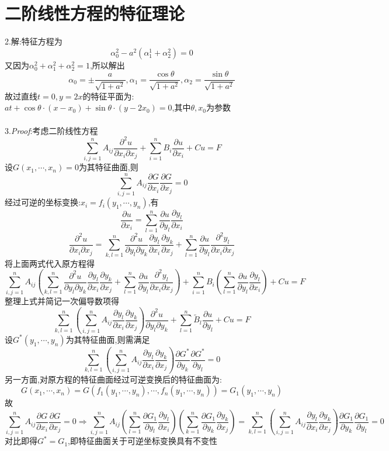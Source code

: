 \section{二阶线性方程的特征理论}
2.解:特征方程为
\[\alpha_0^2-a^2(\alpha_1^1+\alpha_2^2)=0\]
又因为$\alpha_0^2+\alpha_1^2+\alpha_2^2=1$,所以解出
\[\alpha_0=\pm\frac{a}{\sqrt{1+a^2}},\alpha_1=\frac{\cos\theta}{\sqrt{1+a^2}},\alpha_2=\frac{\sin\theta}{\sqrt{1+a^2}}\]
故过直线$t=0,y=2x$的特征平面为:$at+\cos\theta\cdot(x-x_0)+\sin\theta\cdot(y-2x_0)=0$,其中$\theta,x_0$为参数\\\\
3.\textit{Proof}:考虑二阶线性方程
\[\sum_{i,j=1}^nA_{ij}\frac{\partial^2u}{\partial x_i\partial x_j}+\sum_{i=1}^nB_i\frac{\partial u}{\partial x_i}+Cu=F\]
设$G(x_1,\cdots,x_n)=0$为其特征曲面,则
\[\sum_{i,j=1}^nA_{ij}\frac{\partial G}{\partial x_i}\frac{\partial G}{\partial x_j}=0\]
经过可逆的坐标变换:$x_i=f_i(y_1,\cdots,y_n)$,有
\[\frac{\partial u}{\partial x_i}=\sum_{l=1}^n\frac{\partial u}{\partial y_l}\frac{\partial y_l}{\partial x_i}\]
\[\frac{\partial^2u}{\partial x_i\partial x_j}=\sum_{k,l=1}^n\frac{\partial^2u}{\partial y_l\partial y_k}\frac{\partial y_l}{\partial x_i}\frac{\partial y_k}{\partial x_j}+\sum_{l=1}^n\frac{\partial u}{\partial y_l}\frac{\partial^2y_l}{\partial x_i\partial x_j}\]
将上面两式代入原方程得
\[\sum_{i,j=1}^nA_{ij}\left(\sum_{k,l=1}^n\frac{\partial^2u}{\partial y_l\partial y_k}\frac{\partial y_l}{\partial x_i}\frac{\partial y_k}{\partial x_j}+\sum_{l=1}^n\frac{\partial u}{\partial y_l}\frac{\partial^2y_l}{\partial x_i\partial x_j}\right)+\sum_{i=1}^nB_i\left(\sum_{l=1}^n\frac{\partial u}{\partial y_l}\frac{\partial y_l}{\partial x_i}\right)+Cu=F\]
整理上式并简记一次偏导数项得
\[\sum_{k,l=1}^n\left(\sum_{i,j=1}^nA_{ij}\frac{\partial y_l}{\partial x_i}\frac{\partial y_k}{\partial x_j}\right)\frac{\partial^2u}{\partial y_l\partial y_k}+\sum_{l=1}^n\widetilde{B}_l\frac{\partial u}{\partial y_l}+Cu=F\]
设$G^*(y_1,\cdots,y_n)$为其特征曲面,则需满足
\[\sum_{k,l=1}^n\left(\sum_{i,j=1}^nA_{ij}\frac{\partial y_l}{\partial x_i}\frac{\partial y_k}{\partial x_j}\right)\frac{\partial G^*}{\partial y_k}\frac{\partial G^*}{\partial y_l}=0\]
另一方面,对原方程的特征曲面经过可逆变换后的特征曲面为:
\[G(x_1,\cdots,x_n)=G(f_1(y_1,\cdots,y_n),\cdots,f_n(y_1,\cdots,y_n))=G_1(y_1,\cdots,y_n)\]
故
\[\sum_{i,j=1}^nA_{ij}\frac{\partial G}{\partial x_i}\frac{\partial G}{\partial x_j}=0\Rightarrow\sum_{i,j=1}^nA_{ij}\left(\sum_{l=1}^n\frac{\partial G_1}{\partial y_l}\frac{\partial y_l}{\partial x_i}\right)\left(\sum_{k=1}^n\frac{\partial G_1}{\partial y_k}\frac{\partial y_k}{\partial x_j}\right)=\sum_{k,l=1}^n\left(\sum_{i,j=1}^nA_{ij}\frac{\partial y_l}{\partial x_i}\frac{\partial y_k}{\partial x_j}\right)\frac{\partial G_1}{\partial y_k}\frac{\partial G_1}{\partial y_l}=0\]
对比即得$G^*=G_1$,即特征曲面关于可逆坐标变换具有不变性
